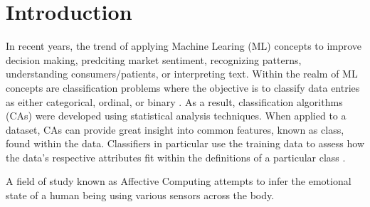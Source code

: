 \section{Introduction}
\label{sec:Introduction}

In recent years, the trend of applying Machine Learing (ML) concepts to improve decision making, predciting 
market sentiment, recognizing patterns, understanding consumers/patients, or interpreting text. 
Within the realm of ML concepts are classification problems where the objective is to classify data entries 
as either categorical, ordinal, or binary \cite{textbook}. 
As a result, classification algorithms (CAs) were developed using statistical analysis techniques. 
When applied to a dataset, CAs can provide great insight into common features, known as class,
found within the data. Classifiers in particular use the training data to assess how the data's respective 
attributes fit within the definitions of a particular class \cite{class}. 

A field of study known as Affective Computing attempts to infer the emotional state of a human being using 
various sensors across the body. 
